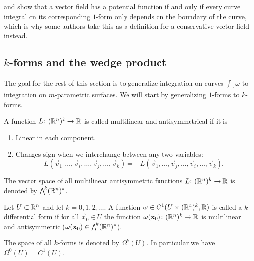 \documentclass[11pt,a4paper]{article}
\begin{document}
\begin{remark}
   and
  show that a vector field has a potential function if and only if
  every curve integral on its corresponding $1$-form only depends on the
  boundary of the curve, which is why some authors take this as a definition
  for a conservative vector field instead.
\end{remark}

\subsection{\texorpdfstring{$k$}{k}-forms and the wedge product}
The goal for the rest of this section is to generalize integration
on curves $\int_{\gamma} \omega$ to integration on $m$-parametric
surfaces.
We will start by generalizing $1$-forms to $k$-forms.

\begin{definition}
  A function $L \colon (\mathbb{R}^n)^k \to \mathbb{R}$ is called multilinear
  and antisymmetrical if it is
  \begin{enumerate}
    \item[(1)] Linear in each component.
    \item[(2)] Changes sign when we interchange between any two
      variables:
      \[
        L(\vec v_1,\dots,\vec v_i,\dots,\vec v_j,\dots,\vec v_k) =
        -L(\vec v_1,\dots,\vec v_j,\dots,\vec v_i,\dots,\vec v_k).
      \]
  \end{enumerate}
\end{definition}
\begin{remark}
  The vector space of all multilinear antisymmetric functions
  $L \colon (\mathbb{R}^n)^k \to \mathbb{R}$ is denoted by $\bigwedge^{\!k}(\mathbb{R}^n)^*$.
\end{remark}

\begin{definition}[$k$-form]
  Let $U \subset \mathbb{R}^n$ and let $k = 0,1,2,\dots$.
  A function $\omega \in C^1(U \times (\mathbb{R}^n)^k,\mathbb{R})$ is called
  a $k$-differential form if for all $\vec x_0 \in U$
  the function $\omega(\boldsymbol{\mathbf{x}}_0) \colon (\mathbb{R}^n)^k \to \mathbb{R}$ is
  multilinear and antisymmetric
  ($\omega(\boldsymbol{\mathbf{x}}_0) \in \bigwedge^{\!k}(\mathbb{R}^n)^*$).
\end{definition}
\begin{remark}
  The space of all $k$-forms is denoted by $\Omega^k(U)$.
  In particular we have $\Omega^0(U) = C^1(U)$.
\end{remark}
\end{document}
